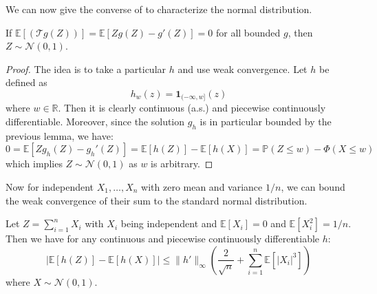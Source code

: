 \documentclass{article}
\begin{document}
We can now give the converse of  to characterize the normal distribution.  

\begin{theorem}
    If $\mathbb{E}[(\mathcal{T}g(Z))]=\mathbb{E}[Zg(Z) - g'(Z)] = 0$ for all bounded $g$, then $Z\sim \mathcal{N}(0,1)$.
\end{theorem}

\begin{proof}
    The idea is to take a particular $h$ and use weak convergence. Let $h$ be defined as 
    \begin{equation*}
        h_w(z) = \mathbf{1}_{(-\infty, w]}(z)
    \end{equation*}
    where $w\in \mathbb{R}$. Then it is clearly continuous (a.s.) and piecewise continuously differentiable. Moreover, since the solution $g_h$ is in particular bounded by the previous lemma, we have:  
    \begin{equation*}
        0 = \mathbb{E}[Zg_h(Z)-g_h'(Z)] = \mathbb{E}[h(Z)] - \mathbb{E}[h(X)]=\mathbb{P}(Z\leq w) - \Phi(X\leq w)
    \end{equation*}
    which implies $Z\sim \mathcal{N}(0,1)$ as $w$ is arbitrary.
\end{proof}

Now for independent $X_1, \ldots, X_n$ with zero mean and variance $1/n$, we can bound the weak convergence of their sum to the standard normal distribution.  

\begin{theorem}
    Let $Z = \sum_{i=1}^{n} X_i$ with $X_i$ being independent and $\mathbb{E}[X_i]=0$ and $\mathbb{E}[X_i^2]=1/n$. Then we have for any continuous and piecewise continuously differentiable $h$:
    \begin{equation*}
        \left|\mathbb{E}[h(Z)] - \mathbb{E}[h(X)]\right| \leq \|h'\|_\infty \left( \frac{2}{\sqrt{n}} + \sum_{i=1}^{n} \mathbb{E}[|X_i|^3]\right)
    \end{equation*}
    where $X\sim \mathcal{N}(0,1)$.
\end{theorem}
\end{document}
